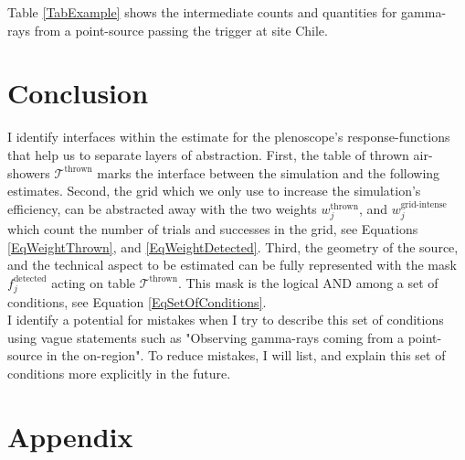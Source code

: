 \documentclass[a4paper,12pt,oneside]{article}
\def\Tab{\mathcal{T}^\text{thrown}}
\def\WeightGridSuccesses{w^\text{grid-intense}}
\begin{document}
%
Table \ref{TabExample} shows the intermediate counts and quantities for gamma-rays from a point-source passing the trigger at site Chile.
%
\section{Conclusion}
%
I identify interfaces within the estimate for the plenoscope's response-functions that  help us to separate layers of abstraction.
%
First, the table of thrown air-showers $\Tab{}$ marks the interface between the simulation and the following estimates.
%
Second, the grid which we only use to increase the simulation's efficiency, can be abstracted away with the two weights $w^\text{thrown}_j$, and $\WeightGridSuccesses_j$ which count the number of trials and successes in the grid, see Equations \ref{EqWeightThrown}, and \ref{EqWeightDetected}.
%
Third, the geometry of the source, and the technical aspect to be estimated can be fully represented with the mask $f^\text{detected}_j$ acting on table $\Tab{}$.
%
This mask is the logical AND among a set of conditions, see Equation \ref{EqSetOfConditions}.\\
%
I identify a potential for mistakes when I try to describe this set of conditions using vague statements such as "Observing gamma-rays coming from a point-source in the on-region".
%
To reduce mistakes, I will list, and explain this set of conditions more explicitly in the future.
%
\newpage
\section{Appendix}
%
\end{document}
